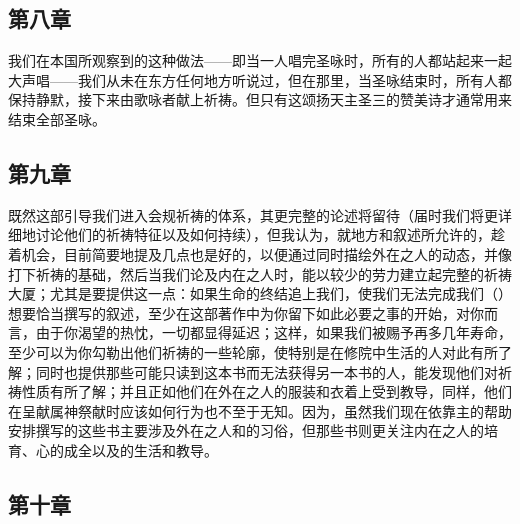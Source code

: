 \subsection{第八章}

\par

我们在本国所观察到的这种做法——即当一人唱完圣咏时，所有的人都站起来一起大声唱——我们从未在东方任何地方听说过，但在那里，当圣咏结束时，所有人都保持静默，接下来由歌咏者献上祈祷。但只有这颂扬天主圣三的赞美诗才通常用来结束全部圣咏。\par


\subsection{第九章}

\par

既然这部引导我们进入会规祈祷的体系，其更完整的论述将留待（届时我们将更详细地讨论他们的祈祷特征以及如何持续），但我认为，就地方和叙述所允许的，趁着机会，目前简要地提及几点也是好的，以便通过同时描绘外在之人的动态，并像打下祈祷的基础，然后当我们论及内在之人时，能以较少的劳力建立起完整的祈祷大厦；尤其是要提供这一点：如果生命的终结追上我们，使我们无法完成我们（）想要恰当撰写的叙述，至少在这部著作中为你留下如此必要之事的开始，对你而言，由于你渴望的热忱，一切都显得延迟；这样，如果我们被赐予再多几年寿命，至少可以为你勾勒出他们祈祷的一些轮廓，使特别是在修院中生活的人对此有所了解；同时也提供那些可能只读到这本书而无法获得另一本书的人，能发现他们对祈祷性质有所了解；并且正如他们在外在之人的服装和衣着上受到教导，同样，他们在呈献属神祭献时应该如何行为也不至于无知。因为，虽然我们现在依靠主的帮助安排撰写的这些书主要涉及外在之人和的习俗，但那些书则更关注内在之人的培育、心的成全以及的生活和教导。\par


\subsection{第十章}

